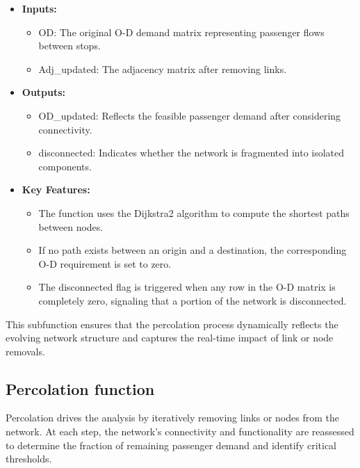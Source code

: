 \documentclass[
  letterpaper,
  DIV=11,
  numbers=noendperiod]{scrartcl}
\providecommand{\tightlist}{%
  \setlength{\itemsep}{0pt}\setlength{\parskip}{0pt}}\usepackage{longtable,booktabs,array}
\begin{document}
\begin{itemize}
\tightlist
\item
  \textbf{Inputs:}

  \begin{itemize}
  \tightlist
  \item
    OD: The original O-D demand matrix representing passenger flows
    between stops.
  \item
    Adj\_updated: The adjacency matrix after removing links.
  \end{itemize}
\item
  \textbf{Outputs:}

  \begin{itemize}
  \tightlist
  \item
    OD\_updated: Reflects the feasible passenger demand after
    considering connectivity.
  \item
    disconnected: Indicates whether the network is fragmented into
    isolated components.
  \end{itemize}
\item
  \textbf{Key Features:}

  \begin{itemize}
  \tightlist
  \item
    The function uses the Dijkstra2 algorithm to compute the shortest
    paths between nodes.
  \item
    If no path exists between an origin and a destination, the
    corresponding O-D requirement is set to zero.
  \item
    The disconnected flag is triggered when any row in the O-D matrix is
    completely zero, signaling that a portion of the network is
    disconnected.
  \end{itemize}
\end{itemize}

This subfunction ensures that the percolation process dynamically
reflects the evolving network structure and captures the real-time
impact of link or node removals.

\subsection{Percolation function}\label{percolation-function}

Percolation drives the analysis by iteratively removing links or nodes
from the network. At each step, the network's connectivity and
functionality are reassessed to determine the fraction of remaining
passenger demand and identify critical thresholds.
\end{document}
